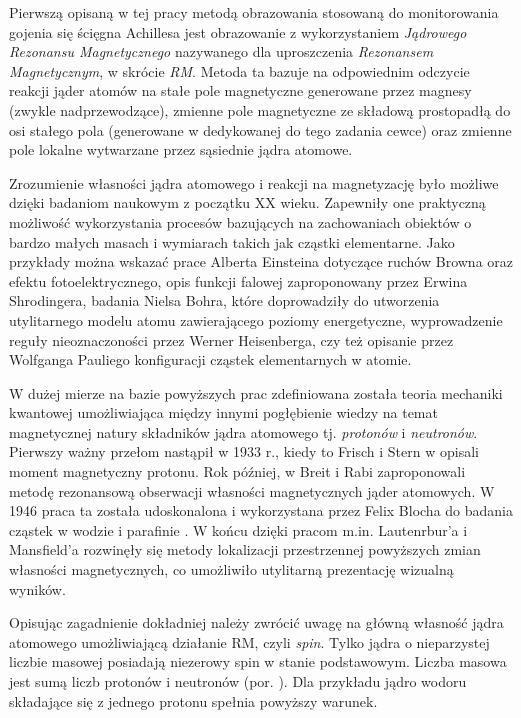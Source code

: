 Pierwszą opisaną w tej pracy metodą obrazowania stosowaną do monitorowania gojenia się ścięgna Achillesa jest obrazowanie z wykorzystaniem \textit{Jądrowego Rezonansu Magnetycznego} nazywanego dla uproszczenia \textit{Rezonansem Magnetycznym}, w skrócie \textit{RM}. Metoda ta bazuje na odpowiednim odczycie reakcji jąder atomów na stałe pole magnetyczne generowane przez magnesy (zwykle nadprzewodzące), zmienne pole magnetyczne ze składową prostopadłą do osi stałego pola (generowane w dedykowanej do tego zadania cewce) oraz zmienne pole lokalne wytwarzane przez sąsiednie jądra atomowe.

Zrozumienie własności jądra atomowego i reakcji na magnetyzację było możliwe dzięki badaniom naukowym z początku XX wieku. Zapewniły one praktyczną możliwość wykorzystania procesów bazujących na zachowaniach obiektów o bardzo małych masach i wymiarach takich jak cząstki elementarne. Jako przykłady można wskazać prace Alberta Einsteina dotyczące ruchów Browna oraz efektu fotoelektrycznego, opis funkcji falowej zaproponowany przez Erwina Shrodingera, badania Nielsa Bohra, które doprowadziły do utworzenia utylitarnego modelu atomu zawierającego poziomy energetyczne, wyprowadzenie reguły nieoznaczoności przez Werner Heisenberga, czy też opisanie przez Wolfganga Pauliego konfiguracji cząstek elementarnych w atomie. 

W dużej mierze na bazie powyższych prac zdefiniowana została teoria mechaniki kwantowej umożliwiająca między innymi pogłębienie wiedzy na temat magnetycznej natury składników jądra atomowego tj. \textit{protonów} i \textit{neutronów}. Pierwszy ważny przełom nastąpił w 1933 r., kiedy to Frisch i Stern w \cite{Frisch1933} opisali moment magnetyczny protonu. Rok później, w \cite{Breit1934} Breit i Rabi zaproponowali metodę rezonansową obserwacji własności magnetycznych jąder atomowych. W 1946 praca ta została udoskonalona i wykorzystana przez Felix Blocha do badania cząstek w wodzie i parafinie \cite{Bloch1946}. W końcu dzięki pracom m.in. Lautenrbur'a \cite{LAUTERBUR1973} i Mansfield'a \cite{Mansfield1977} rozwinęły się metody lokalizacji przestrzennej powyższych zmian własności magnetycznych, co umożliwiło utylitarną prezentację wizualną wyników. 

Opisując zagadnienie dokładniej należy zwrócić uwagę na główną własność jądra atomowego umożliwiającą działanie RM, czyli \textit{spin}. Tylko jądra o nieparzystej liczbie masowej posiadają niezerowy spin w stanie podstawowym. Liczba masowa jest sumą liczb protonów i neutronów (por. \cite{RM2015}). Dla przykładu jądro wodoru składające się z jednego protonu spełnia powyższy warunek. 

